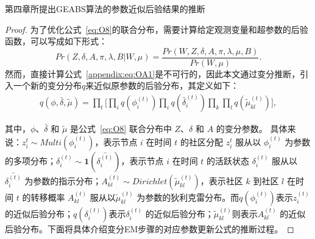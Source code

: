 




















\begin{proposition}
	第四章所提出GEABS算法的参数近似后验结果的推断
	\label{GEABS:inference}
\end{proposition}

\begin{proof}
	
	为了优化公式~\ref{eq:O8}的联合分布，需要计算给定观测变量和超参数的后验函数，可以写成如下形式：
	\begin{equation}
		Pr(Z,\delta, A, \pi, \lambda, B | W, \mu) =
		\frac{Pr(W, Z,\delta, A, \pi, \lambda, \mu, B)}{Pr( W, \mu)}.
		\label{appendix:eq:OA1}
	\end{equation}
	然而，直接计算公式~\ref{appendix:eq:OA1}是不可行的，因此本文通过变分推断，引入一个新的变分分布$q$来近似原参数的后验分布，其定义如下：
	\begin{equation}
		\begin{split}
			q(\phi,\bar{\delta}, \tilde{\mu}) = \prod_t \Big[ \prod_i q(\phi_i^{(t)}) \prod_i q(\bar{\delta}_i^{(t)}) \prod_k \prod_l q(\tilde{\mu}_{kl}^{(t)}) \Big],
		\end{split}
		\label{appendix:qfunc}
	\end{equation}
	
	其中，$\phi$、$\bar{\delta}$ 和 $\tilde{\mu}$ 是公式~\ref{eq:O8} 联合分布中 $Z$、$\delta$ 和 $A$ 的变分参数。  
	具体来说：$z_i^t \sim Multi(\phi_i^{(t)})$，表示节点 $i$ 在时间 $t$ 的社区分配 $z_i^t$ 服从以 $\phi_i^{(t)}$ 为参数的多项分布；$\delta_i^{(t)} \sim \mathbf{1}(\bar{\delta_i^{(t)}})$，表示节点 $i$ 在时间 $t$ 的活跃状态 $\delta_i^{(t)}$ 服从以 $\bar{\delta_i^{(t)}}$ 为参数的指示分布；$A_{kl}^{(t)} \sim Dirichlet(\tilde{\mu}_{kl}^{(t)})$，表示社区 $k$ 到社区 $l$ 在时间 $t$ 的转移概率 $A_{kl}^{(t)}$ 服从以$\tilde{\mu}_{kl}^{(t)}$ 为参数的狄利克雷分布。而$q(\phi_i^{(t)})$表示$z_i^{(t)}$ 的近似后验分布；$q(\delta_i^{(t)})$表示$\delta_i^{(t)}$ 的近似后验分布；$\tilde{\mu}_{kl}^{(t)}$则表示$A_{kl}^{(t)}$ 的近似后验分布。下面将具体介绍变分EM步骤的对应参数更新公式的推断过程。
	

\end{proof}
